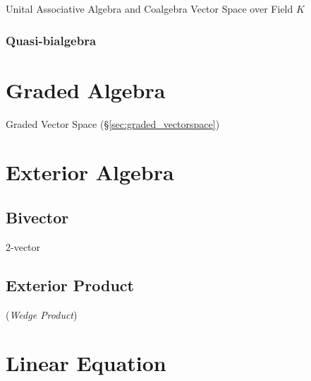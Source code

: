 Unital Associative Algebra and Coalgebra Vector Space over Field $K$



\subsubsection{Quasi-bialgebra}\label{sec:quasi_bialgebra}



\section{Graded Algebra}\label{sec:graded_algebra}

Graded Vector Space (\S\ref{sec:graded_vectorspace})



\section{Exterior Algebra}\label{sec:exterior_algebra}

\subsection{Bivector}\label{sec:bivector}

$2$-vector



\subsection{Exterior Product}\label{sec:exterior_product}

(\emph{Wedge Product})



\section{Linear Equation}\label{sec:linear_equation}

